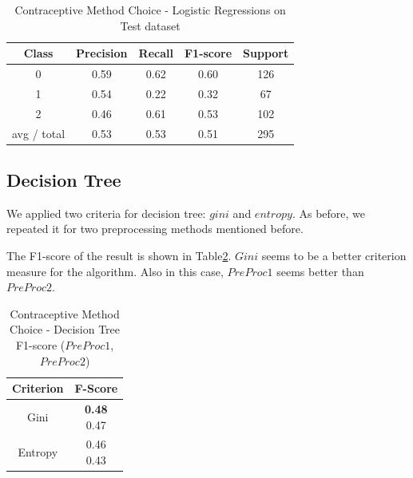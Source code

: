 \begin{table}[p]
\begin{center}
\begin{tabular}{|c|c|c|c|c|}
\hline Class & Precision & Recall & F1-score & Support \\

\hline 0 & 0.59 & 0.62 & 0.60 & 126\\
\hline 1 & 0.54 & 0.22 & 0.32 & 67\\
\hline 2 & 0.46 & 0.61 & 0.53 & 102\\
\hline avg / total & 0.53 & 0.53 & 0.51 & 295\\
\hline
\end{tabular}

\caption{Contraceptive Method Choice - Logistic Regressions on Test dataset}
\label{ds1:table:logisticregression-test}
\end{center}
\end{table}

\subsection{Decision Tree}
We applied two criteria for decision tree: $gini$ and $entropy$. As before, we repeated it for two preprocessing methods mentioned before.

The F1-score of the result is shown in Table\ref{ds1:table:decisiontree}. $Gini$ seems to be a better criterion measure for the algorithm. Also in this case, $PreProc1$ seems better than $PreProc2$.


\begin{table}[p]
\begin{center}
\begin{tabular}{|c|c|}
\hline Criterion & F-Score \\

\hline Gini & \minibox{\textbf{0.48}\\ 0.47} \\

\hline Entropy & \minibox{0.46\\ 0.43} \\

\hline
\end{tabular}

\caption{Contraceptive Method Choice - Decision Tree F1-score ($PreProc1$, $PreProc2$)}
\label{ds1:table:decisiontree}
\end{center}
\end{table}

